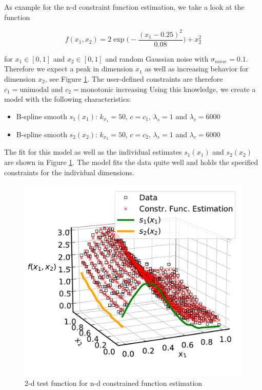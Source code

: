 \documentclass[10pt,a4paper]{article}
\begin{document}
	As example for the n-d constraint function estimation, we take a look at the function 
	
	$$f(x_1, x_2) = 2\exp{\Big(-\frac{(x_1 - 0.25)^2}{0.08}\Big)} + x_2^2 $$
	
	for $x_1 \in [0,1]$ and $x_2 \in [0,1]$ and random Gaussian noise with $\sigma_{noise} = 0.1$. Therefore we expect a peak in dimension $x_1$ as well as increasing behavior for dimension $x_2$, see Figure \ref{fig:2d_example}. The user-defined constraints are therefore $c_1 = \text{unimodal}$ and $c_2 = \text{monotonic increasing}$ Using this knowledge, we create a model with the following characteristics:
	
	\begin{itemize}
		\item B-spline smooth $s_1(x_1)$: $k_{x_1} = 50$, $c = c_1$, $\lambda_s = 1$ and $\lambda_c = 6000$
		\item B-spline smooth $s_2(x_2)$: $k_{x_2} = 50$, $c = c_2$, $\lambda_s = 1$ and $\lambda_c = 6000$
	\end{itemize}
		
	The fit for this model as well as the individual estimates $s_1(x_1)$ and $s_2(x_2)$ are shown in Figure \ref{fig:2d_example}. The model fits the data quite well and holds the specified constraints for the individual dimensions.
		
	\begin{figure}[H]
	\centering
	\includegraphics[width=\linewidth]{../thesisplots/2d_example.pdf}
	\caption{2-d test function for n-d constrained function estimation}
	\label{fig:2d_example}
	\end{figure}


	
\printbibliography
	
\end{document}
